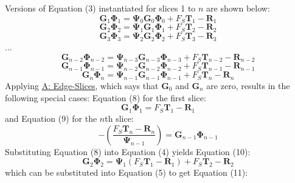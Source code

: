 \documentclass[12pt]{article}
\begin{document}
Versions of Equation (3) instantiated for slices 1 to $n$ are shown below:
\begin{displaymath}
{\mathbf{G}}_{1} {\mathbf{Φ}}_{1}={\mathbf{Ψ}}_{0} {\mathbf{G}}_{0} {\mathbf{Φ}}_{0}+{F_{S}} {\mathbf{T}}_{1}-{\mathbf{R}}_{1}
\end{displaymath}
\begin{displaymath}
{\mathbf{G}}_{2} {\mathbf{Φ}}_{2}={\mathbf{Ψ}}_{1} {\mathbf{G}}_{1} {\mathbf{Φ}}_{1}+{F_{S}} {\mathbf{T}}_{2}-{\mathbf{R}}_{2}
\end{displaymath}
\begin{displaymath}
{\mathbf{G}}_{3} {\mathbf{Φ}}_{3}={\mathbf{Ψ}}_{2} {\mathbf{G}}_{2} {\mathbf{Φ}}_{2}+{F_{S}} {\mathbf{T}}_{3}-{\mathbf{R}}_{3}
\end{displaymath}
...
\begin{displaymath}
{\mathbf{G}}_{n-2} {\mathbf{Φ}}_{n-2}={\mathbf{Ψ}}_{n-3} {\mathbf{G}}_{n-3} {\mathbf{Φ}}_{n-3}+{F_{S}} {\mathbf{T}}_{n-2}-{\mathbf{R}}_{n-2}
\end{displaymath}
\begin{displaymath}
{\mathbf{G}}_{n-1} {\mathbf{Φ}}_{n-1}={\mathbf{Ψ}}_{n-2} {\mathbf{G}}_{n-2} {\mathbf{Φ}}_{n-2}+{F_{S}} {\mathbf{T}}_{n-1}-{\mathbf{R}}_{n-1}
\end{displaymath}
\begin{displaymath}
{\mathbf{G}}_{n} {\mathbf{Φ}}_{n}={\mathbf{Ψ}}_{n-1} {\mathbf{G}}_{n-1} {\mathbf{Φ}}_{n-1}+{F_{S}} {\mathbf{T}}_{n}-{\mathbf{R}}_{n}
\end{displaymath}
Applying \hyperref[assumpES]{A: Edge-Slices}, which says that ${\mathbf{G}}_{0}$ and ${\mathbf{G}}_{n}$ are zero, results in the following special cases: Equation (8) for the first slice:
\begin{displaymath}
{\mathbf{G}}_{1} {\mathbf{Φ}}_{1}={F_{S}} {\mathbf{T}}_{1}-{\mathbf{R}}_{1}
\end{displaymath}
and Equation (9) for the $n$th slice:
\begin{displaymath}
-\left(\frac{{F_{S}} {\mathbf{T}}_{n}-{\mathbf{R}}_{n}}{{\mathbf{Ψ}}_{n-1}}\right)={\mathbf{G}}_{n-1} {\mathbf{Φ}}_{n-1}
\end{displaymath}
Substituting Equation (8) into Equation (4) yields Equation (10):
\begin{displaymath}
{\mathbf{G}}_{2} {\mathbf{Φ}}_{2}={\mathbf{Ψ}}_{1} \left({F_{S}} {\mathbf{T}}_{1}-{\mathbf{R}}_{1}\right)+{F_{S}} {\mathbf{T}}_{2}-{\mathbf{R}}_{2}
\end{displaymath}
which can be substituted into Equation (5) to get Equation (11):
\end{document}
